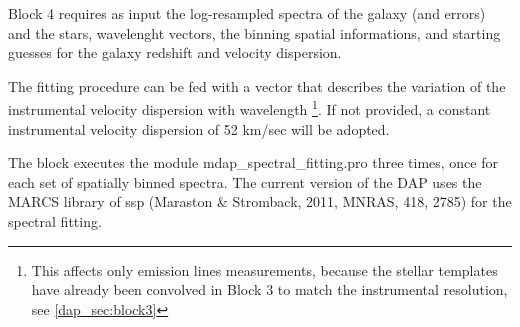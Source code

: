 \documentclass[11pt]{book}
\begin{document}
Block 4 requires as input the log-resampled spectra of the galaxy (and
errors) and the stars, wavelenght vectors, the binning spatial
informations, and starting guesses for the galaxy redshift and
velocity dispersion.

The fitting procedure can be fed with a vector that describes the
variation of the instrumental velocity dispersion with
wavelength \footnote{This affects only emission lines measurements,
  because the stellar templates have already been convolved in Block 3
  to match the instrumental resolution, see \ref{dap_sec:block3}}. If
not provided, a constant instrumental velocity dispersion of 52 km/sec
will be adopted.

The block executes the module mdap\_spectral\_fitting.pro three times,
once for each set of spatially binned spectra.  The current version of
the DAP uses the MARCS library of ssp  (Maraston \& Stromback,
2011, MNRAS, 418, 2785) for the spectral fitting.
\end{document}
